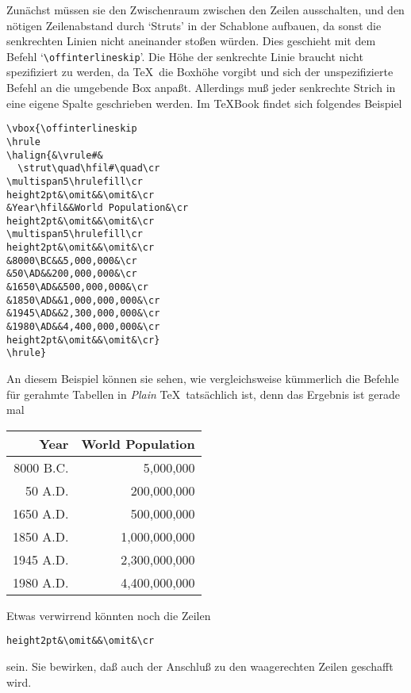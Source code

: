 Zun\"achst m\"ussen sie den 
Zwischenraum zwischen den Zeilen ausschalten,
und den n\"otigen 
Zeilenabstand durch `Struts' in der Schablone
aufbauen, da sonst die senkrechten 
Linien nicht aneinander sto\ss{}en
w\"urden. Dies geschieht mit dem Befehl
`\verb|\offinterlineskip|'. Die
H\"ohe der senkrechte Linie braucht nicht spezifiziert zu werden, da
\TeX\ die Boxh\"ohe vorgibt und sich der unspezifizierte Befehl an die
umgebende Box anpa\ss{}t. Allerdings mu\ss{} jeder senkrechte Strich in eine
eigene Spalte geschrieben werden. Im \TeX Book findet sich folgendes
Beispiel
\begin{verbatim}
\vbox{\offinterlineskip
\hrule
\halign{&\vrule#&
  \strut\quad\hfil#\quad\cr
\multispan5\hrulefill\cr
height2pt&\omit&&\omit&\cr
&Year\hfil&&World Population&\cr
height2pt&\omit&&\omit&\cr
\multispan5\hrulefill\cr
height2pt&\omit&&\omit&\cr
&8000\BC&&5,000,000&\cr
&50\AD&&200,000,000&\cr
&1650\AD&&500,000,000&\cr
&1850\AD&&1,000,000,000&\cr
&1945\AD&&2,300,000,000&\cr
&1980\AD&&4,400,000,000&\cr
height2pt&\omit&&\omit&\cr}
\hrule}
\end{verbatim}
An diesem Beispiel k\"onnen sie sehen, wie vergleichsweise k\"ummerlich
die Befehle f\"ur gerahmte Tabellen in {\em Plain} \TeX\ tats\"achlich ist, denn
das Ergebnis ist gerade mal

\medskip\begin{tabular}{|r|r|}\hline
Year\hfil & World Population \\ \hline
8000 B.C. & 5,000,000\\
50 A.D.   & 200,000,000\\
1650 A.D. & 500,000,000\\
1850 A.D. & 1,000,000,000\\
1945 A.D. & 2,300,000,000\\
1980 A.D. & 4,400,000,000\\ \hline
\end{tabular}\medskip

Etwas verwirrend k\"onnten noch die Zeilen
\begin{verbatim}
height2pt&\omit&&\omit&\cr
\end{verbatim}
sein. Sie bewirken, da\ss{} auch der Anschlu\ss{} zu den waagerechten Zeilen
geschafft wird.
